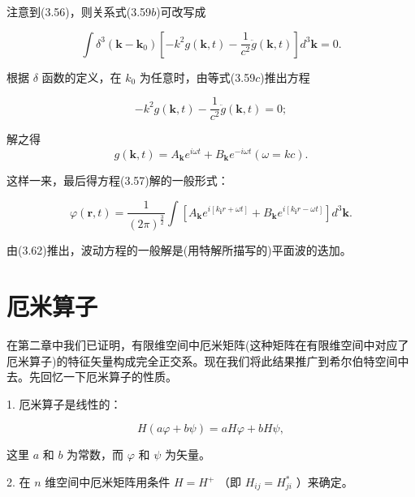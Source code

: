 注意到(3.56)，则关系式(3.59$b$)可改写成

\begin{equation*}
\int \delta^ {3} (\boldsymbol {k} - \boldsymbol {k} _ {0}) \left[ - k ^ {2} g (\boldsymbol {k}, t) - \frac {1}{c ^ {2}} \ddot {g} (\boldsymbol {k}, t) \right] d ^ {3} \boldsymbol {k} = 0.\tag{3.59c}
\end{equation*}

根据 $\delta$ 函数的定义，在 $k_{0}$ 为任意时，由等式(3.59$c$)推出方程

\begin{equation*}
- k ^ {2} g (\boldsymbol {k}, t) - \frac {1}{c ^ {2}} \ddot {g} (\boldsymbol {k}, t) = 0;\tag{3.60}
\end{equation*}

解之得
\begin{equation*}
g (\boldsymbol {k}, t) = A _ {\boldsymbol {k}} e ^ {i \omega t} + B _ {\boldsymbol {k}} e ^ {- i \omega t} (\omega = k c).\tag{3.61}
\end{equation*}

这样一来，最后得方程(3.57)解的一般形式：

\begin{equation*}
\varphi (\boldsymbol {r}, t) = \frac {1}{(2 \pi) ^ {\frac {3}{2}}} \int [ A _ {\boldsymbol {k}} e ^ {i [ k _ {\boldsymbol {i}} r + \omega t ]} + B _ {\boldsymbol {k}} e ^ {i [ k _ {\boldsymbol {i}} r - \omega t ]} ] d ^ {3} \boldsymbol {k}.\tag{3.62}
\end{equation*}

由(3.62)推出，波动方程的一般解是(用特解所描写的)平面波的迭加。

\section{厄米算子}

在第二章中我们已证明，有限维空间中厄米矩阵(这种矩阵在有限维空间中对应了厄米算子)的特征矢量构成完全正交系。现在我们将此结果推广到希尔伯特空间中去。先回忆一下厄米算子的性质。

1. 厄米算子是线性的：

\begin{equation*}
H (a \varphi + b \psi) = a H \varphi + b H \psi ,\tag{3.63}
\end{equation*}

这里 $a$ 和 $b$ 为常数，而 $\varphi$ 和 $\psi$ 为矢量。

2. 在 $n$ 维空间中厄米矩阵用条件 $H = H^{+}$ （即 $H_{ij} = H_{ji}^{*}$ ）来确定。

